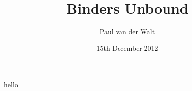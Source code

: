 \documentclass[]{beamer}
\author{Paul van der Walt}
\institute{Utrecht University}
\date{15th December 2012}
\title{Binders Unbound}
\begin{document}
\begin{frame}
    \maketitle
\end{frame}


% 





\begin{frame}
    hello\cite{weirich2011binders}
\end{frame}


\begin{frame}
    {} %
    
    
\end{frame}
\end{document}
